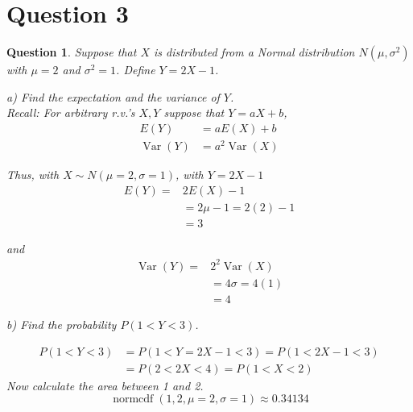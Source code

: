 \documentclass{article}
\theoremstyle{questionstyle}
\newtheorem{myquestion}{Question}
\begin{document}
\section{Question 3}
\begin{myquestion}
Suppose that \(X\) is distributed from a Normal distribution \(N(\mu, \sigma^2)\) with \(\mu = 2\) and \(\sigma^2 = 1\). Define \(Y = 2X - 1\).

a) Find the expectation and the variance of \(Y\).\\

Recall: For arbitrary r.v.'s \(X,Y\) suppose that \(Y=aX+b\), 
\begin{align*}
    E(Y) &= aE(X) + b\\
    \operatorname{Var}(Y) &= a^2\operatorname{Var}(X)
\end{align*}

Thus, with \(X \sim N(\mu = 2, \sigma = 1)\), with \(Y=2X-1\)
\begin{align*}
    E(Y) =& 2E(X)-1\\ 
    &= 2\mu -1 = 2(2)-1\\
    &= 3
\end{align*}

and 
\begin{align*}
    \operatorname{Var}(Y) =& 2^2\operatorname{Var}(X)\\ 
    &= 4\sigma = 4(1)\\
    &= 4
\end{align*}


b) Find the probability \(P(1 < Y < 3)\).

\begin{align*}
    P(1<Y<3) &= P(1< Y=2X-1 <3) =  P(1< 2X-1 <3)\\
    &=  P(2< 2X <4) = P(1< X < 2)
\end{align*}
Now calculate the area between 1 and 2.
\[ \operatorname{normcdf}(1,2, \mu=2,\sigma=1) \approx 0.34134\]
\end{myquestion} %
\end{document}

